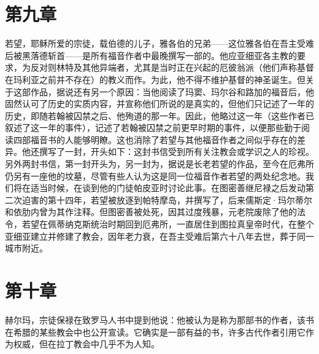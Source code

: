 
\section{第九章}

若望，耶稣所爱的宗徒，载伯德的儿子，雅各伯的兄弟——这位雅各伯在吾主受难后被黑落德斩首——是所有福音作者中最晚撰写一部的。他应亚细亚各主教的要求，为反对则林特及其他异端者，尤其是当时正在兴起的厄彼翁派（他们声称基督在玛利亚之前并不存在）的教义而作。为此，他不得不维护基督的神圣诞生。但关于这部作品，据说还有另一个原因：当他阅读了玛窦、玛尔谷和路加的福音后，他固然认可了历史的实质内容，并宣称他们所说的是真实的，但他们只记述了一年的历史，即随若翰被囚禁之后、他殉道的那一年。因此，他略过这一年（这些作者已叙述了这一年的事件），记述了若翰被囚禁之前更早时期的事件，以便那些勤于阅读四部福音书的人能够明瞭。这也消除了若望与其他福音作者之间似乎存在的差异。他还撰写了一封，开头如下：这封书信受到所有关注教会或学识之人的珍视。另外两封书信，第一封开头为，另一封为，据说是长老若望的作品，至今在厄弗所仍另有一座他的坟墓，尽管有些人认为这是同一位福音作者若望的两处纪念地。我们将在适当时候，在谈到他的门徒帕皮亚时讨论此事。在图密善继尼禄之后发动第二次迫害的第十四年，若望被放逐到帕特摩岛，并撰写了，后来儒斯定·玛尔蒂尔和依肋内曾为其作注释。但图密善被处死，因其过度残暴，元老院废除了他的法令，若望在佩蒂纳克斯统治时期回到厄弗所，一直居住到图拉真皇帝时代，在整个亚细亚建立并修建了教会，因年老力衰，在吾主受难后第六十八年去世，葬于同一城市附近。\par


\section{第十章}

赫尔玛，宗徒保禄在致罗马人书中提到他说：他被认为是称为那部书的作者，该书在希腊的某些教会中也公开宣读。它确实是一部有益的书，许多古代作者引用它作为权威，但在拉丁教会中几乎不为人知。\par


